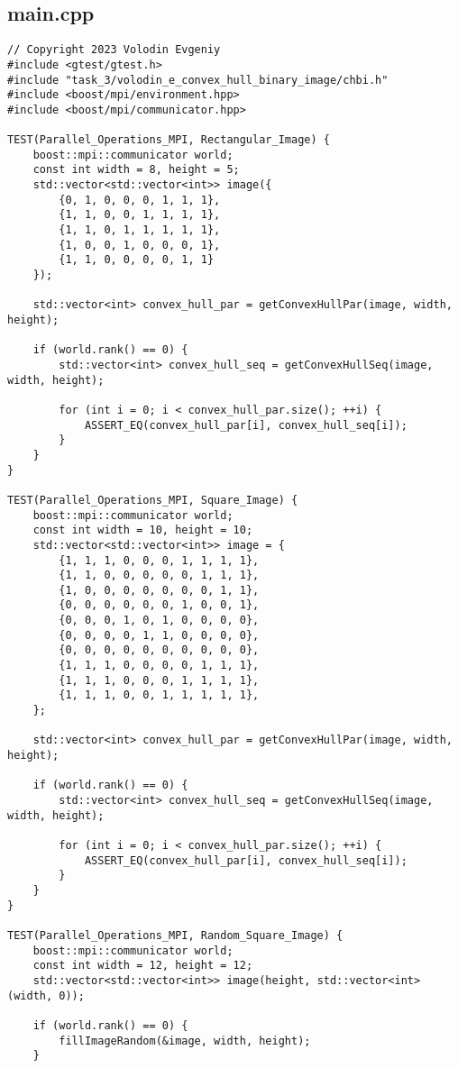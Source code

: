 \subsection*{main.cpp}
\begin{verbatim}
// Copyright 2023 Volodin Evgeniy
#include <gtest/gtest.h>
#include "task_3/volodin_e_convex_hull_binary_image/chbi.h"
#include <boost/mpi/environment.hpp>
#include <boost/mpi/communicator.hpp>

TEST(Parallel_Operations_MPI, Rectangular_Image) {
	boost::mpi::communicator world;
	const int width = 8, height = 5;
	std::vector<std::vector<int>> image({
		{0, 1, 0, 0, 0, 1, 1, 1},
		{1, 1, 0, 0, 1, 1, 1, 1},
		{1, 1, 0, 1, 1, 1, 1, 1},
		{1, 0, 0, 1, 0, 0, 0, 1},
		{1, 1, 0, 0, 0, 0, 1, 1}
	});
	
	std::vector<int> convex_hull_par = getConvexHullPar(image, width, height);
	
	if (world.rank() == 0) {
		std::vector<int> convex_hull_seq = getConvexHullSeq(image, width, height);
		
		for (int i = 0; i < convex_hull_par.size(); ++i) {
			ASSERT_EQ(convex_hull_par[i], convex_hull_seq[i]);
		}
	}
}

TEST(Parallel_Operations_MPI, Square_Image) {
	boost::mpi::communicator world;
	const int width = 10, height = 10;
	std::vector<std::vector<int>> image = {
		{1, 1, 1, 0, 0, 0, 1, 1, 1, 1},
		{1, 1, 0, 0, 0, 0, 0, 1, 1, 1},
		{1, 0, 0, 0, 0, 0, 0, 0, 1, 1},
		{0, 0, 0, 0, 0, 0, 1, 0, 0, 1},
		{0, 0, 0, 1, 0, 1, 0, 0, 0, 0},
		{0, 0, 0, 0, 1, 1, 0, 0, 0, 0},
		{0, 0, 0, 0, 0, 0, 0, 0, 0, 0},
		{1, 1, 1, 0, 0, 0, 0, 1, 1, 1},
		{1, 1, 1, 0, 0, 0, 1, 1, 1, 1},
		{1, 1, 1, 0, 0, 1, 1, 1, 1, 1},
	};
	
	std::vector<int> convex_hull_par = getConvexHullPar(image, width, height);
	
	if (world.rank() == 0) {
		std::vector<int> convex_hull_seq = getConvexHullSeq(image, width, height);
		
		for (int i = 0; i < convex_hull_par.size(); ++i) {
			ASSERT_EQ(convex_hull_par[i], convex_hull_seq[i]);
		}
	}
}

TEST(Parallel_Operations_MPI, Random_Square_Image) {
	boost::mpi::communicator world;
	const int width = 12, height = 12;
	std::vector<std::vector<int>> image(height, std::vector<int>(width, 0));
	
	if (world.rank() == 0) {
		fillImageRandom(&image, width, height);
	}
	

\end{verbatim}
